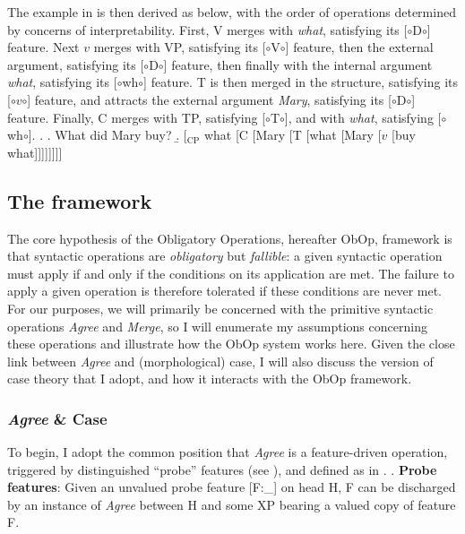\documentclass[11pt, letterpaper]{paper_nick}
\newcommand{\fm}[1]{[$\circ$#1$\circ$]}
\begin{document}
The example in \Next is then derived as below, with the order of operations determined by concerns of interpretability. First, V merges with \emph{what}, satisfying its \fm{D} feature. Next $v$ merges with VP, satisfying its \fm{V} feature, then the external argument, satisfying its \fm{D} feature, then finally with the internal argument \emph{what}, satisfying its \fm{wh} feature. T is then merged in the structure, satisfying its \fm{$v$} feature, and attracts the external argument \emph{Mary}, satisfying its \fm{D} feature. Finally, C merges with TP, satisfying \fm{T}, and with \emph{what}, satisfying \fm{wh}.  
\ex. \a. What did Mary buy?
\b. [$_\text{CP}$ what [C [Mary [T [what [Mary [$v$ [buy what]]]]]]]]


\subsection{The framework}
The core hypothesis of the Obligatory Operations, hereafter ObOp, framework is that syntactic operations are \emph{obligatory} but \emph{fallible}: a given syntactic operation must apply if and only if the conditions on its application are met. The failure to apply a given operation is therefore tolerated if these conditions are never met. For our purposes, we will primarily be concerned with the primitive syntactic operations \emph{Agree} and \emph{Merge}, so I will enumerate my assumptions concerning these operations and illustrate how the ObOp system works here. Given the close link between \emph{Agree} and (morphological) case, I will also discuss the version of case theory that I adopt, and how it interacts with the ObOp framework. 

\subsubsection{\emph{Agree} \& Case}
To begin, I adopt the common position that \emph{Agree} is a feature-driven operation, triggered by distinguished ``probe'' features (see \Next), and defined as in \NNext.
\ex. \textbf{Probe features}: Given an unvalued probe feature [F:\_] on head H, F can be discharged by an instance of \emph{Agree} between H and some XP bearing a valued copy of feature F. 
\end{document}
